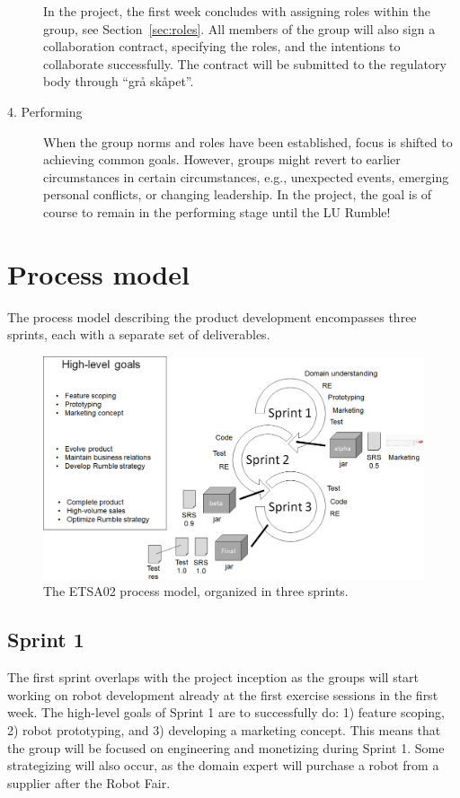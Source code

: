 \documentclass{scrreprt}
\begin{document}
\begin{description}
In the project, the first week concludes with assigning roles within the group, see Section~\ref{sec:roles}. All members of the group will also sign a collaboration contract, specifying the roles, and the intentions to collaborate successfully. The contract will be submitted to the regulatory body through ``grå skåpet''.
\item[4. Performing] When the group norms and roles have been established, focus is shifted to achieving common goals. However, groups might revert to earlier circumstances in certain circumstances, e.g., unexpected events, emerging personal conflicts, or changing leadership. In the project, the goal is of course to remain in the performing stage until the LU Rumble!
\end{description}

\section{Process model} \label{sec:process}
The process model describing the product development encompasses three sprints, each with a separate set of deliverables. 

\begin{figure}
\centering
\includegraphics[width=1.0\textwidth]{figures/processModel.png}
\caption{The ETSA02 process model, organized in three sprints.}
\label{fig:overview}
\end{figure}

\subsection{Sprint 1}
The first sprint overlaps with the project inception as the groups will start working on robot development already at the first exercise sessions in the first week. The high-level goals of Sprint 1 are to successfully do: 1) feature scoping, 2) robot prototyping, and 3) developing a marketing concept. This means that the group will be focused on engineering and monetizing during Sprint 1. Some strategizing will also occur, as the domain expert will purchase a robot from a supplier after the Robot Fair.
\end{document}
